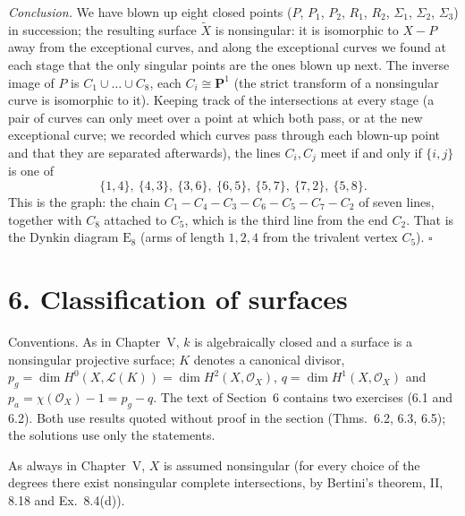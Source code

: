 \documentclass[11pt]{article}
\begin{document}
\emph{Conclusion.} We have blown up eight closed points ($P$, $P_1$, $P_2$, $R_1$, $R_2$, $\Sigma_1$, $\Sigma_2$, $\Sigma_3$) in succession; the resulting surface $\widetilde X$ is nonsingular: it is isomorphic to $X-P$ away from the exceptional curves, and along the exceptional curves we found at each stage that the only singular points are the ones blown up next. The inverse image of $P$ is $C_1\cup\dots\cup C_8$, each $C_i\cong\mathbf P^1$ (the strict transform of a nonsingular curve is isomorphic to it). Keeping track of the intersections at every stage (a pair of curves can only meet over a point at which both pass, or at the new exceptional curve; we recorded which curves pass through each blown-up point and that they are separated afterwards), the lines $C_i,C_j$ meet if and only if $\{i,j\}$ is one of
\[
\{1,4\},\ \{4,3\},\ \{3,6\},\ \{6,5\},\ \{5,7\},\ \{7,2\},\ \{5,8\}.
\]
This is the graph: the chain $C_1-C_4-C_3-C_6-C_5-C_7-C_2$ of seven lines, together with $C_8$ attached to $C_5$, which is the third line from the end $C_2$. That is the Dynkin diagram $\mathrm E_8$ (arms of length $1,2,4$ from the trivalent vertex $C_5$). \hfill$\square$

\section*{6. Classification of surfaces}

Conventions. As in Chapter~V, $k$ is algebraically closed and a surface is a nonsingular projective surface; $K$ denotes a canonical divisor, $p_g=\dim H^0(X,\mathcal L(K))=\dim H^2(X,\mathcal O_X)$, $q=\dim H^1(X,\mathcal O_X)$ and $p_a=\chi(\mathcal O_X)-1=p_g-q$. The text of Section~6 contains two exercises (6.1 and 6.2). Both use results quoted without proof in the section (Thms.~6.2, 6.3, 6.5); the solutions use only the statements.

\pf
As always in Chapter~V, $X$ is assumed nonsingular (for every choice of the degrees there exist nonsingular complete intersections, by Bertini's theorem, II, 8.18 and Ex.~8.4(d)).
\end{document}
